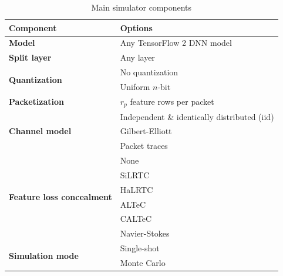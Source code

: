 \documentclass[conference,letterpaper]{IEEEtran}
\begin{document}
\begin{table}[t]   \caption{Main simulator components}
  \label{table:description:components}
  \centering
 \begin{tabular}{ l | l }
   \textbf{Component} & \textbf{Options} \\
      \hline
      \hline
      \textbf{Model} & Any TensorFlow 2 DNN model \\
      \hline  
      \textbf{Split layer} & Any layer \\
      \hline
      \multirow{2}{*}{\textbf{Quantization}} & No quantization \\  & Uniform $n$-bit \\
      \hline
      \textbf{Packetization} & $r_p$ feature rows per packet \\
      \hline
      \multirow{3}{*}{\textbf{Channel model}} & Independent \& identically distributed (iid)\\
       & Gilbert-Elliott\\
       & Packet traces    \\
      \hline
      \multirow{6}{*}{\textbf{Feature loss concealment}}  & None \\
       & SiLRTC~\cite{liu2012tensor} \\
       & HaLRTC~\cite{liu2012tensor} \\
       & ALTeC~\cite{Bragile2020} \\
       & CALTeC~\cite{CALTeC_ICIP_2021} \\
       & Navier-Stokes~\cite{navierstokes}\\
      \hline
      \multirow{2}{*}{\textbf{Simulation mode}} & Single-shot \\
       & Monte Carlo\\
      \hline
    \end{tabular}
\end{table}
\end{document}
